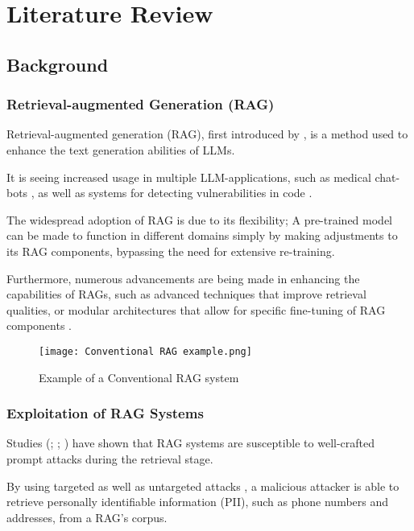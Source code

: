 \chapter{Literature Review}
\section{Background}

\subsection{Retrieval-augmented Generation (RAG)}
Retrieval-augmented generation (RAG), first introduced by \autocite{lewis2021retrievalaugmentedgenerationknowledgeintensivenlp}, is a method used to enhance the text generation abilities of LLMs.

It is seeing increased usage in multiple LLM-applications, such as medical chat-bots \autocite{jin2024healthllmpersonalizedretrievalaugmenteddisease}, as well as systems for detecting vulnerabilities in code \autocite{du2024vulragenhancingllmbasedvulnerability}.

The widespread adoption of RAG is due to its flexibility; A pre-trained model can be made to function in different domains simply by making adjustments to its RAG components, bypassing the need for extensive re-training.

Furthermore, numerous advancements are being made in enhancing the capabilities of RAGs, such as advanced techniques that improve retrieval qualities, or modular architectures that allow for specific fine-tuning of RAG components \autocite{gao2024retrievalaugmentedgenerationlargelanguage}.

\begin{figure}
	\texttt{[image: Conventional RAG example.png]}
	\caption{Example of a Conventional RAG system}
	\centering
	\label{fig:RAGexample}
\end{figure}

\subsection{Exploitation of RAG Systems}
Studies (\cite{tan2024gluepizzaeatrocks}; \cite{zeng2024goodbadexploringprivacy}; \cite{xue2024badragidentifyingvulnerabilitiesretrieval}) have shown that RAG systems are susceptible to well-crafted prompt attacks during the retrieval stage.

By using targeted as well as untargeted attacks \autocite{zeng2024goodbadexploringprivacy}, a malicious attacker is able to retrieve personally identifiable information (PII), such as phone numbers and addresses, from a RAG's corpus.


